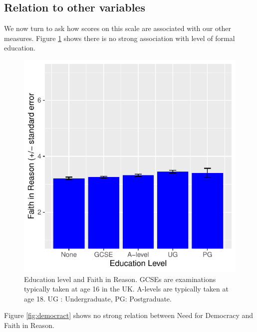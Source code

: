 \documentclass[
  ,jou,floatsintext]{apa6}
\begin{document}
\hypertarget{relation-to-other-variables}{%
\subsection{Relation to other variables}\label{relation-to-other-variables}}

We now turn to ask how scores on this scale are associated with our other measures. Figure \ref{fig:education} shows there is no strong association with level of formal education.

\begin{figure}

{\centering \includegraphics[width=0.75\linewidth]{faithinreason_files/figure-latex/education-1} 

}

\caption{Education level and Faith in Reason. GCSEs are examinations typically taken at age 16 in the UK. A-levels are typically taken at age 18. UG : Undergraduate, PG: Postgraduate.}\label{fig:education}
\end{figure}

Figure \ref{fig:democract} shows no strong relation between Need for Democracy and Faith in Reason.
\end{document}
